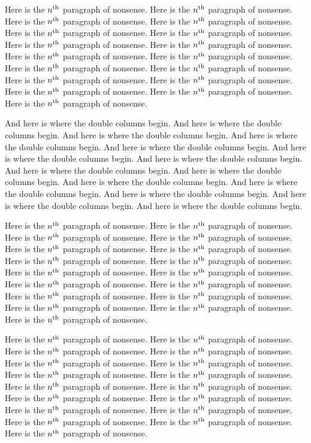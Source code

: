 Here is the $n^{\rm th}$ paragraph of nonsense.
Here is the $n^{\rm th}$ paragraph of nonsense.
Here is the $n^{\rm th}$ paragraph of nonsense.
Here is the $n^{\rm th}$ paragraph of nonsense.
Here is the $n^{\rm th}$ paragraph of nonsense.
Here is the $n^{\rm th}$ paragraph of nonsense.
Here is the $n^{\rm th}$ paragraph of nonsense.
Here is the $n^{\rm th}$ paragraph of nonsense.
Here is the $n^{\rm th}$ paragraph of nonsense.
Here is the $n^{\rm th}$ paragraph of nonsense.
Here is the $n^{\rm th}$ paragraph of nonsense.
Here is the $n^{\rm th}$ paragraph of nonsense.
Here is the $n^{\rm th}$ paragraph of nonsense.
Here is the $n^{\rm th}$ paragraph of nonsense.
Here is the $n^{\rm th}$ paragraph of nonsense.
Here is the $n^{\rm th}$ paragraph of nonsense.
Here is the $n^{\rm th}$ paragraph of nonsense.

\doublecolumns

And here is where the double columns begin.
And here is where the double columns begin.
And here is where the double columns begin.
And here is where the double columns begin.
And here is where the double columns begin.
And here is where the double columns begin.
And here is where the double columns begin.
And here is where the double columns begin.
And here is where the double columns begin.
And here is where the double columns begin.
And here is where the double columns begin.
And here is where the double columns begin.
And here is where the double columns begin.
And here is where the double columns begin.

Here is the $n^{\rm th}$ paragraph of nonsense.
Here is the $n^{\rm th}$ paragraph of nonsense.
Here is the $n^{\rm th}$ paragraph of nonsense.
Here is the $n^{\rm th}$ paragraph of nonsense.
Here is the $n^{\rm th}$ paragraph of nonsense.
Here is the $n^{\rm th}$ paragraph of nonsense.
Here is the $n^{\rm th}$ paragraph of nonsense.
Here is the $n^{\rm th}$ paragraph of nonsense.
Here is the $n^{\rm th}$ paragraph of nonsense.
Here is the $n^{\rm th}$ paragraph of nonsense.
Here is the $n^{\rm th}$ paragraph of nonsense.
Here is the $n^{\rm th}$ paragraph of nonsense.
Here is the $n^{\rm th}$ paragraph of nonsense.
Here is the $n^{\rm th}$ paragraph of nonsense.
Here is the $n^{\rm th}$ paragraph of nonsense.
Here is the $n^{\rm th}$ paragraph of nonsense.
Here is the $n^{\rm th}$ paragraph of nonsense.

Here is the $n^{\rm th}$ paragraph of nonsense.
Here is the $n^{\rm th}$ paragraph of nonsense.
Here is the $n^{\rm th}$ paragraph of nonsense.
Here is the $n^{\rm th}$ paragraph of nonsense.
Here is the $n^{\rm th}$ paragraph of nonsense.
Here is the $n^{\rm th}$ paragraph of nonsense.
Here is the $n^{\rm th}$ paragraph of nonsense.
Here is the $n^{\rm th}$ paragraph of nonsense.
Here is the $n^{\rm th}$ paragraph of nonsense.
Here is the $n^{\rm th}$ paragraph of nonsense.
Here is the $n^{\rm th}$ paragraph of nonsense.
Here is the $n^{\rm th}$ paragraph of nonsense.
Here is the $n^{\rm th}$ paragraph of nonsense.
Here is the $n^{\rm th}$ paragraph of nonsense.
Here is the $n^{\rm th}$ paragraph of nonsense.
Here is the $n^{\rm th}$ paragraph of nonsense.
Here is the $n^{\rm th}$ paragraph of nonsense.

